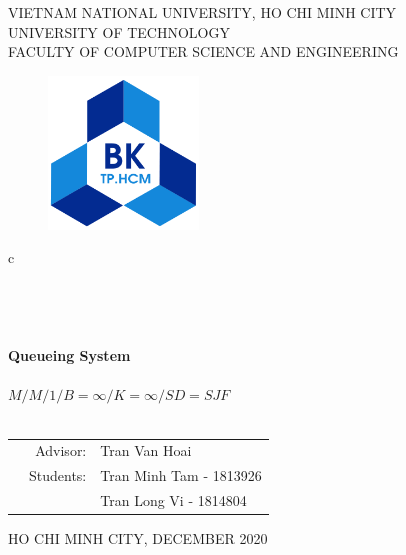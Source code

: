\documentclass[13pt,a4paper]{article}
\begin{document}
	
	\begin{titlepage}
		\begin{center}
			VIETNAM NATIONAL UNIVERSITY, HO CHI MINH CITY \\
			UNIVERSITY OF TECHNOLOGY\\
			FACULTY OF COMPUTER SCIENCE AND ENGINEERING
		\end{center}
		
		\vspace{1cm}
		
		\begin{figure}[h!]
			\begin{center}
				\includegraphics[width=4cm]{hcmut.png}
			\end{center}
		\end{figure}
		
		\vspace{1cm}
		
		\begin{center}
			\color{blue}
			\begin{tabular}{c}
				\\
				~~\\
				\hline
				\\
				\\
				\\
				\textbf{{\Huge Queueing System}}\\ \\
				\textbf{{\Huge $M/M/1/B=\infty/K=\infty/SD=SJF$}}\\
				\\
				\hline
			\end{tabular}
			\color{blue}
		\end{center}
		\vspace{1cm}
		
		\begin{table}[h]
			\color{blue}
			\begin{tabular}{rrl}
				\hspace{3 cm} & Advisor: & Tran Van Hoai\\ 
				& Students: & Tran Minh Tam - 1813926 \\
							& & Tran Long Vi - 1814804 \\
			\end{tabular}
			\color{blue}
		\end{table}
		
		\vspace{0.5 cm}
		\begin{center}
			{\footnotesize\normalsize HO CHI MINH CITY, DECEMBER 2020}
		\end{center}
	\end{titlepage}
	
\end{document}
